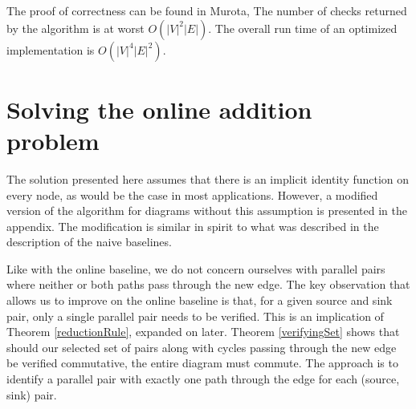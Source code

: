 \documentclass[sigplan,review,anonymous]{acmart}
\begin{document}
The proof of correctness can be found in Murota\cite{commutative}, 
The number of checks returned by the algorithm is at worst $O(|V|^2|E|)$. The overall run time of an optimized implementation is $O(|V|^4|E|^2)$.

\section{Solving the online addition problem}


The solution presented here assumes that there is an implicit identity function on every node, as would be the case in most applications. However, a modified version of the algorithm for diagrams without this assumption is presented in the appendix. The modification is similar in spirit to what was described in the description of the naive baselines.

Like with the online baseline, we do not concern ourselves with parallel pairs where neither or both paths pass through the new edge.
The key observation that allows us to improve on the online baseline is that, for a given source and sink pair, only a single parallel pair needs to be verified. 
This is an implication of Theorem \ref{reductionRule}, expanded on later.
Theorem \ref{verifyingSet} shows that should our selected set of pairs along with cycles passing through the new edge be verified commutative, the entire diagram must commute. The approach is to identify a parallel pair with exactly one path through the edge for each (source, sink) pair.
\end{document}
